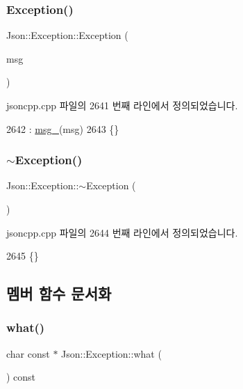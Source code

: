 \subsubsection{\texorpdfstring{Exception()}{Exception()}}
{\footnotesize\ttfamily Json\+::\+Exception\+::\+Exception (\begin{DoxyParamCaption}\item[{\hyperlink{json_8h_a1e723f95759de062585bc4a8fd3fa4be}{J\+S\+O\+N\+C\+P\+P\+\_\+\+S\+T\+R\+I\+NG} const \&}]{msg }\end{DoxyParamCaption})}



jsoncpp.\+cpp 파일의 2641 번째 라인에서 정의되었습니다.


\begin{DoxyCode}
2642   : \hyperlink{class_json_1_1_exception_aae3cbb8b45bf21480f64502a8329659f}{msg\_}(msg)
2643 \{\}
\end{DoxyCode}
\mbox{\label{class_json_1_1_exception_add6af5e0ecdf36f40d7f3554b9786e21}} 
\subsubsection{\texorpdfstring{$\sim$\+Exception()}{~Exception()}}
{\footnotesize\ttfamily Json\+::\+Exception\+::$\sim$\+Exception (\begin{DoxyParamCaption}{ }\end{DoxyParamCaption})}



jsoncpp.\+cpp 파일의 2644 번째 라인에서 정의되었습니다.


\begin{DoxyCode}
2645 \{\}
\end{DoxyCode}


\subsection{멤버 함수 문서화}
\mbox{\label{class_json_1_1_exception_a70b7ce35e761fb93e8cd338e04619cd6}} 
\subsubsection{\texorpdfstring{what()}{what()}}
{\footnotesize\ttfamily char const  $\ast$ Json\+::\+Exception\+::what (\begin{DoxyParamCaption}{ }\end{DoxyParamCaption}) const}



